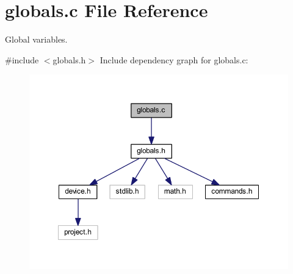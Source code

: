 \section{globals.\+c File Reference}
\label{globals_8c}


Global variables.  


{\ttfamily \#include $<$globals.\+h$>$}\newline
Include dependency graph for globals.\+c\+:
\nopagebreak
\begin{figure}[H]
\begin{center}
\leavevmode
\includegraphics[width=350pt]{globals_8c__incl}
\end{center}
\end{figure}
